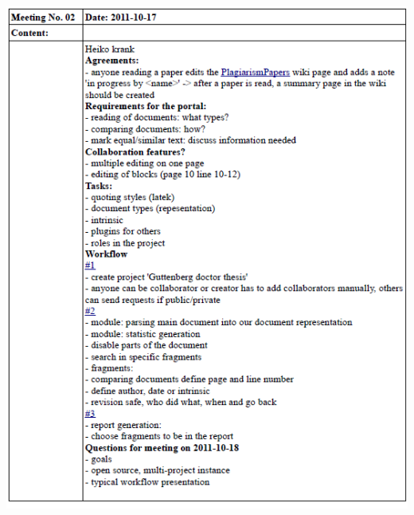 \begin{appendix}
    \includegraphics[width=\textwidth]{images/a_meetings/meeting_02.png}




\end{appendix}
